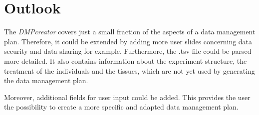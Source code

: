 \section{Outlook}

The \textit{DMPcreator} covers just a small fraction of the aspects of a data management plan. Therefore, it could be extended by adding more user slides concerning data security and data sharing for example. Furthermore, the .tsv file could be parsed more detailed. It also contains information about the experiment structure, the treatment of the individuals and the tissues, which are not yet used by generating the data management plan. 


Moreover, additional fields for user input could be added. This provides the user the possibility to create a more specific and adapted data management plan. 